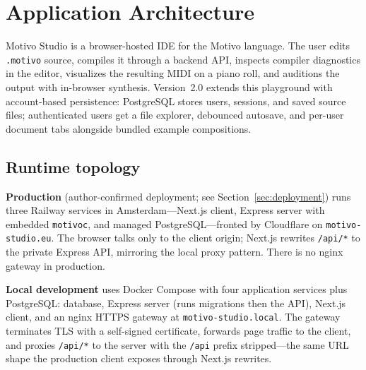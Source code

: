 \section{Application Architecture}\label{sec:studio-architecture}

Motivo Studio is a browser-hosted IDE for the Motivo language.
The user edits \texttt{.motivo} source, compiles it through a backend API, inspects compiler diagnostics in the
editor, visualizes the resulting MIDI on a piano roll, and auditions the output with in-browser synthesis.
Version~2.0 extends this playground with account-based persistence: PostgreSQL stores users, sessions, and saved
source files; authenticated users get a file explorer, debounced autosave, and per-user document tabs alongside
bundled example compositions.

\subsection{Runtime topology}\label{subsec:studio-runtime-topology}

\textbf{Production} (author-confirmed deployment; see Section~\ref{sec:deployment}) runs three Railway services in
Amsterdam---Next.js client, Express server with embedded \texttt{motivoc}, and managed PostgreSQL---fronted by
Cloudflare on \texttt{motivo-studio.eu}.
The browser talks only to the client origin; Next.js rewrites \texttt{/api/*} to the private Express API, mirroring
the local proxy pattern.
There is no nginx gateway in production.

\textbf{Local development} uses Docker Compose with four application services plus PostgreSQL: database,
Express server (runs migrations then the API), Next.js client, and an nginx HTTPS gateway at
\texttt{motivo-studio.local}.
The gateway terminates TLS with a self-signed certificate, forwards page traffic to the client, and proxies
\texttt{/api/*} to the server with the \texttt{/api} prefix stripped---the same URL shape the production client
exposes through Next.js rewrites.

